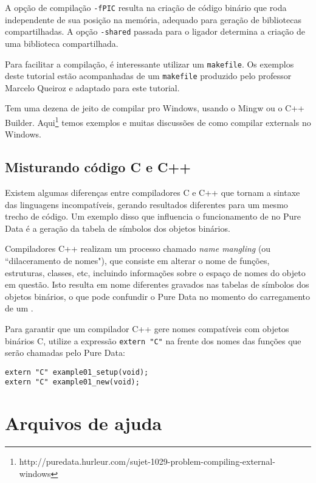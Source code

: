 A opção de compilação \texttt{-fPIC} resulta na criação de código binário que
roda independente de sua posição na memória, adequado para geração de
bibliotecas compartilhadas. A opção \texttt{-shared} passada para o ligador
determina a criação de uma biblioteca compartilhada.

Para facilitar a compilação, é interessante utilizar um \texttt{makefile}. Os
exemplos deste tutorial estão acompanhadas de um \texttt{makefile} produzido
pelo professor Marcelo Queiroz e adaptado para este tutorial.

Tem uma dezena de jeito de compilar pro Windows, usando o Mingw ou o C++ Builder.
Aqui\footnote{http://puredata.hurleur.com/sujet-1029-problem-compiling-external-windows}
 temos exemplos e muitas discussões de como compilar externals no Windows.


\subsection{Misturando código C e C++}

Existem algumas diferenças entre compiladores C e C++ que tornam a sintaxe das
linguagens incompatíveis, gerando resultados diferentes para um mesmo trecho
de código. Um exemplo disso que influencia o funcionamento de \externals no
Pure Data é a geração da tabela de símbolos dos objetos binários.

Compiladores C++ realizam um processo chamado \emph{name mangling} (ou
``dilaceramento de nomes"), que consiste em alterar o nome de funções,
estruturas, classes, etc, incluindo informações sobre o espaço de nomes do
objeto em questão. Isto resulta em nome diferentes gravados nas tabelas de
símbolos dos objetos binários, o que pode confundir o Pure Data no momento do
carregamento de um \external.

Para garantir que um compilador C++ gere nomes compatíveis com objetos
binários C, utilize a expressão \texttt{extern "C"} na frente dos nomes das
funções que serão chamadas pelo Pure Data:

\begin{lstlisting}
extern "C" example01_setup(void);
extern "C" example01_new(void);
\end{lstlisting}


\section{Arquivos de ajuda}

